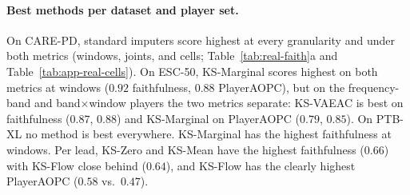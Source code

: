 \begin{table}[t]
\centering
\caption{\textbf{Real-data protocol.}  Tasks, classifiers, and the three
player-set tracks per dataset.  All tracks: $3$ folds, $200$ sequences per
fold ($200/180/200$ on CARE-PD), folds pooled.  Sampled designs share the
coalition protocol of Appendix~\ref{app:coalition_protocol} (seed $7919$).
CARE-PD folds are leave-one-subject-out.  ESC-50 uses folds $1$--$3$ of its
$5$ stratified folds.}
\label{tab:app-real-protocol}
\small
\setlength{\tabcolsep}{4pt}
\end{table}

\paragraph{Best methods per dataset and player set.}
\label{app:real_best}
On CARE-PD, standard imputers score highest at every granularity and under
both metrics (windows, joints, and cells; Table~\ref{tab:real-faith}a and
Table~\ref{tab:app-real-cells}).  On ESC-50, KS-Marginal scores highest on
both metrics at windows ($0.92$ faithfulness, $0.88$ PlayerAOPC), but on
the frequency-band and band$\times$window players the two metrics
separate: KS-VAEAC is best on faithfulness ($0.87$, $0.88$) and KS-Marginal
on PlayerAOPC ($0.79$, $0.85$).  On PTB-XL no method is best everywhere.
KS-Marginal has the highest faithfulness at windows.  Per lead, KS-Zero and
KS-Mean have the highest faithfulness ($0.66$) with KS-Flow close behind
($0.64$), and KS-Flow has the clearly highest PlayerAOPC ($0.58$ vs.\
$0.47$).

